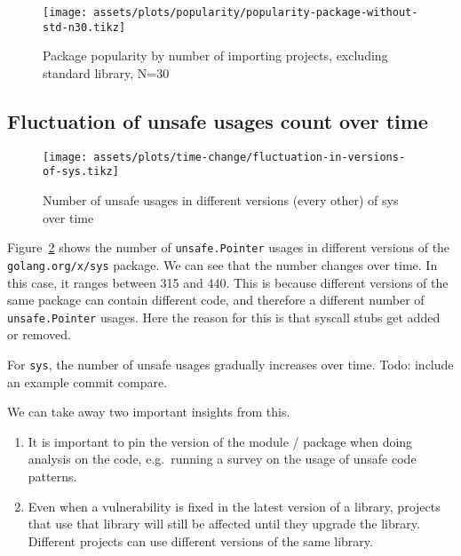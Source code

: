 \begin{figure}[ht]
    \centering
    {\scriptsize \texttt{[image: assets/plots/popularity/popularity-package-without-std-n30.tikz]}}
    \caption{Package popularity by number of importing projects, excluding standard library, N=30}
    \label{fig:popularity-package}
\end{figure}



\subsection{Fluctuation of unsafe usages count over time}\label{subsec:results-time-change}

\begin{figure}[ht]
    \centering
    {\scriptsize \texttt{[image: assets/plots/time-change/fluctuation-in-versions-of-sys.tikz]}}
    \caption{Number of unsafe usages in different versions (every other) of sys over time}
    \label{fig:fluctuation-in-versions-of-sys}
\end{figure}

Figure~\ref{fig:fluctuation-in-versions-of-sys} shows the number of \texttt{unsafe.Pointer} usages in different versions
of the \texttt{golang.org/x/sys} package.
We can see that the number changes over time.
In this case, it ranges between 315 and 440.
This is because different versions of the same package can contain different code, and therefore a different number of
\texttt{unsafe.Pointer} usages.
Here the reason for this is that syscall stubs get added or removed.

For \texttt{sys}, the number of unsafe usages gradually increases over time.
Todo: include an example commit compare.

We can take away two important insights from this.

\begin{enumerate}
    \item It is important to pin the version of the module / package when doing analysis on the code, e.g.\ running a
    survey on the usage of unsafe code patterns.
    \item Even when a vulnerability is fixed in the latest version of a library, projects that use that library will
    still be affected until they upgrade the library.
    Different projects can use different versions of the same library.
\end{enumerate}

